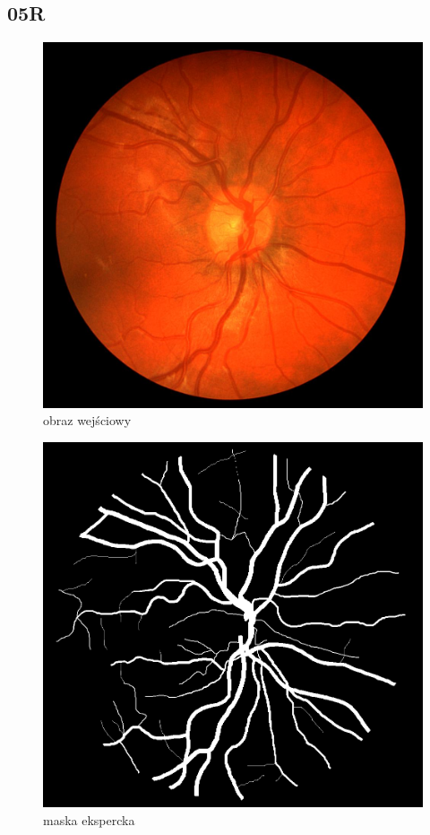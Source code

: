 \documentclass[polish,polish,a4paper]{article}
\begin{document}
		\subsection{05R}

\begin{figure}[!h]
	\centering
	\begin{minipage}{0.26\linewidth}
		\includegraphics[width=\linewidth]{../chase/Image_05R.jpg}
		\centering
			\small{obraz wejściowy}
	\end{minipage}
	\hfill
	\begin{minipage}{0.26\linewidth}
		\includegraphics[width=\linewidth]{../chase/Image_05R_1stHO.png}
		\centering
			\small{maska ekspercka}
	\end{minipage}
\end{figure}
\end{document}
